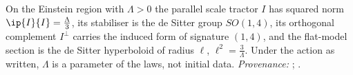 On the Einstein region with $\Lambda > 0$ the parallel scale tractor $I$ has squared norm $\ip{I}{I} = \tfrac{\Lambda}{3}$, its stabiliser is the de Sitter group $SO(1,4)$, its orthogonal complement $I^{\perp}$ carries the induced form of signature $(1,4)$, and the flat-model section is the de Sitter hyperboloid of radius $\ell$, $\ell^{2} = \tfrac{3}{\Lambda}$. Under the action as written, $\Lambda$ is a parameter of the laws, not initial data. \emph{Provenance:} \cite[Thm.~4.7, Prop.~4.10, Prop.~4.4]{ButlerT6}; \cite[Fact~2.1, Thm.~3.1, Prop.~5.8]{ButlerT10}.
